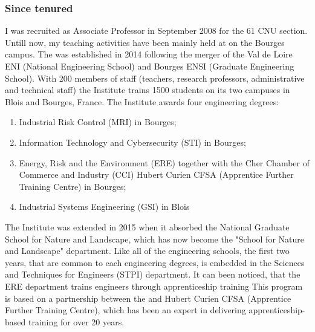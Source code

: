 \subsubsection{Since tenured}
I was recruited as Associate Professor  in September 2008 for the 61 CNU section.
Untill now, my teaching activities have been mainly held at  \INSA \CVL on the Bourges campus.
The \INSA \CVL was established in 2014 following the merger of the Val de Loire ENI (National Engineering School) and Bourges ENSI (Graduate Engineering School).
With 200 members of staff (teachers, research professors, administrative and technical staff) the Institute trains 1500 students on its two campuses in Blois and Bourges, France. 
The Institute awards four engineering degrees:
\begin{enumerate}
  \item Industrial Risk Control (MRI) in Bourges;
  \item Information Technology and Cybersecurity (STI)   in Bourges; 
  \item Energy, Risk and the Environment (ERE) together with the Cher Chamber of Commerce and Industry (CCI) Hubert Curien CFSA (Apprentice Further Training Centre) in Bourges;
  \item Industrial Systems Engineering (GSI) in Blois
\end{enumerate}
The Institute was extended in 2015 when it absorbed the National Graduate School for Nature and Landscape, which has now become the "School for Nature and Landscape" department. 
Like all of the \INSA engineering schools, the first two years, that are common to each engineering degrees, is embedded in the Sciences and Techniques for Engineers (STPI) department.
It can been noticed, that the ERE department trains engineers through apprenticeship training
This program is  based on a partnership between the \INSA \CVL and Hubert Curien CFSA (Apprentice Further Training Centre), which has been an expert in delivering apprenticeship-based training for over 20 years.


\SkipAndBreak


